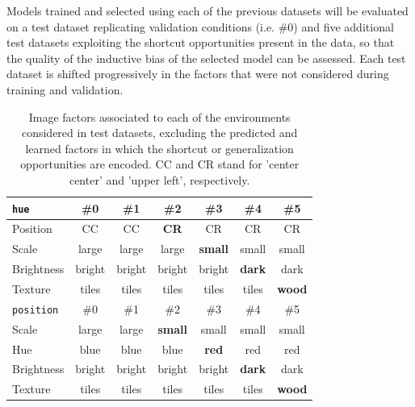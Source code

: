 \begin{definition}
\begin{figure}[H]
\begin{subfigure}[b]{0.45\textwidth}
\begin{subfigure}[b]{0.48\textwidth}
            \end{subfigure}
        \end{subfigure}
    \end{figure}
\end{definition}

Models trained and selected using each of the previous datasets will be evaluated
on a test dataset replicating validation conditions (i.e. \#0) and five additional test
datasets exploiting the shortcut opportunities present in the data, so that the quality of
the inductive bias of the selected model can be assessed. Each test dataset is shifted 
progressively in the factors that were not considered during training and validation.

\begin{table}[H]
    \centering
    \begin{tabular}{l|c|c|c|c|c|c}
    \texttt{hue} & \#0 & \#1 & \#2 & \#3 & \#4 & \#5 \\
    \midrule
    Position & CC & CC & \textbf{CR} & CR & CR & CR \\
    Scale & large & large & large & \textbf{small} & small & small \\
    Brightness & bright & bright & bright & bright & \textbf{dark} & dark \\
    Texture & tiles & tiles & tiles & tiles & tiles & \textbf{wood} \\
    \midrule
    \addlinespace
    \addlinespace
    \texttt{position} & \#0 & \#1 & \#2 & \#3 & \#4 & \#5 \\
    \midrule
    Scale & large & large & \textbf{small} & small & small & small \\
    Hue & blue & blue & blue & \textbf{red} & red & red \\
    Brightness & bright & bright & bright & bright & \textbf{dark} & dark \\
    Texture & tiles & tiles & tiles & tiles & tiles & \textbf{wood} \\
    \bottomrule
    \end{tabular}
    \caption{
        Image factors associated to each of the environments considered in test datasets,
        excluding the predicted and learned factors in which the shortcut or generalization
        opportunities are encoded. CC and CR stand for 'center center' and 'upper left', respectively.
    }
    \label{tab:sogo_test}
\end{table}




 \cleardoublepage

